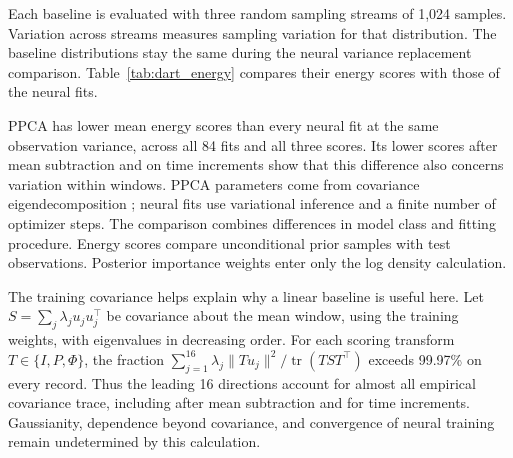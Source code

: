 \documentclass{article}
\begin{document}
Each baseline is evaluated with three random sampling streams of 1,024 samples. Variation across streams measures sampling variation for that distribution. The baseline distributions stay the same during the neural variance replacement comparison. Table~\ref{tab:dart_energy} compares their energy scores with those of the neural fits.

PPCA has lower mean energy scores than every neural fit at the same observation variance, across all 84 fits and all three scores. Its lower scores after mean subtraction and on time increments show that this difference also concerns variation within windows. PPCA parameters come from covariance eigendecomposition \citep{TippingBishop1999ProbabilisticPCA}; neural fits use variational inference and a finite number of optimizer steps. The comparison combines differences in model class and fitting procedure. Energy scores compare unconditional prior samples with test observations. Posterior importance weights enter only the log density calculation.

The training covariance helps explain why a linear baseline is useful here. Let $S=\sum_j\lambda_j u_j u_j^\top$ be covariance about the mean window, using the training weights, with eigenvalues in decreasing order. For each scoring transform $T\in\{I,P,\Phi\}$, the fraction $\sum_{j=1}^{16}\lambda_j\|Tu_j\|^2/\operatorname{tr}(TST^\top)$ exceeds 99.97\% on every record. Thus the leading 16 directions account for almost all empirical covariance trace, including after mean subtraction and for time increments. Gaussianity, dependence beyond covariance, and convergence of neural training remain undetermined by this calculation.
\end{document}

